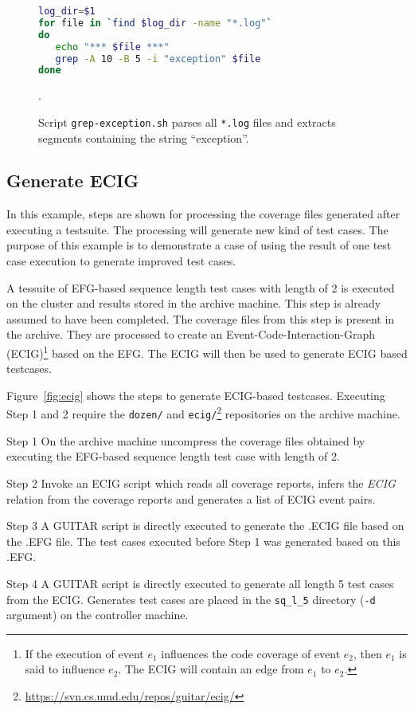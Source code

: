 \begin{figure}
   \scriptsize{
      \begin{lstlisting}[language=sh]
log_dir=$1
for file in `find $log_dir -name "*.log"`
do  
   echo "*** $file ***"
   grep -A 10 -B 5 -i "exception" $file
done
      \end{lstlisting}
   }
   \caption{Script \texttt{grep-exception.sh} parses all \texttt{*.log} files and extracts segments containing the string ``exception''.}
   \label{fig:grepexception}.
\end{figure}


\subsection{Generate ECIG}
\label{sec:ecig}

In this example, steps are shown for processing the coverage files generated after executing a testsuite. The processing will generate new kind of test cases. The purpose of this example is to demonstrate a case of using the result of one test case execution to generate improved test cases.

A tessuite of EFG-based sequence length test cases with length of 2 is executed on the cluster and results stored in the archive machine. This step is already assumed to have been completed. The coverage files from this step is present in the archive. They are processed to create an Event-Code-Interaction-Graph (ECIG)\footnote{If the execution of event $e_1$ influences the code coverage of event $e_2$, then $e_1$ is said to influence $e_2$. The ECIG will contain an edge from $e_1$ to $e_2$.} based on the EFG. The ECIG will then be used to generate ECIG based testcases.

Figure~\ref{fig:ecig} shows the steps to generate ECIG-based testcases. Executing Step 1 and 2 require the \texttt{dozen/} and \texttt{ecig/}\footnote{\url{https://svn.cs.umd.edu/repos/guitar/ecig/}} repositories on the archive machine.\\

\begin{smalldescription}
   \item [Step 1] On the archive machine uncompress the coverage files obtained by executing the EFG-based sequence length test case with length of 2.

   \item [Step 2] Invoke an ECIG script which reads all coverage reports, infers the \textit{ECIG} relation from the coverage reports and generates a list of ECIG event pairs.

   \item [Step 3] A GUITAR script is directly executed to generate the .ECIG file based on the .EFG file. The test cases executed before Step 1 was generated based on this .EFG.

   \item [Step 4] A GUITAR script is directly executed to generate all length 5 test cases from the ECIG. Generates test cases are placed in the \texttt{sq\_l\_5} directory (\texttt{-d} argument) on the controller machine. \\
\end{smalldescription}

